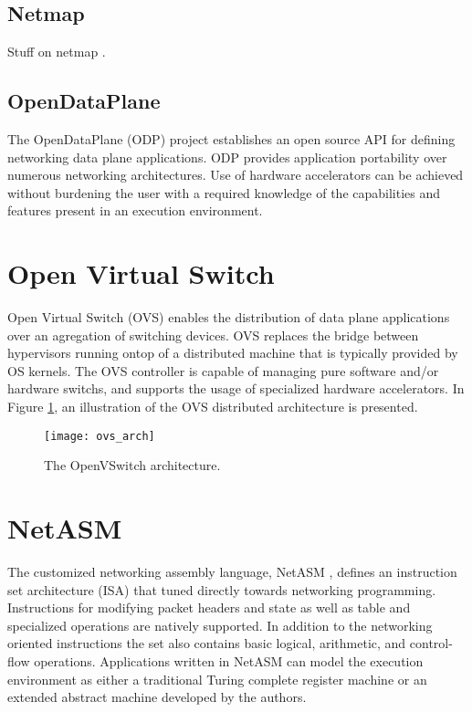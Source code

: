 \subsection{Netmap}
\label{related:netmap}
Stuff on netmap \cite{netmap}.

\subsection{OpenDataPlane}
\label{related:frameworks:odp}
The OpenDataPlane (ODP) project \cite{odp} establishes an open source API for
defining networking data plane applications. ODP provides application
portability over numerous networking architectures. Use of hardware
accelerators can be achieved without burdening the user with a required
knowledge of the capabilities and features present in an execution environment.

\section{Open Virtual Switch}
\label{related:frameworks:ovs}
Open Virtual Switch (OVS) \cite{ovs} enables the distribution of data
plane applications over an agregation of switching devices. OVS replaces
the bridge between hypervisors running ontop of a distributed machine that
is typically provided by OS kernels. The OVS controller is capable of managing
pure software and/or hardware switchs, and supports the usage of specialized
hardware accelerators. In Figure \ref{ovs_arch}, an illustration of
the OVS distributed architecture is presented.

\begin{figure}[h]
\centering
\texttt{[image: ovs\_arch]}
\caption{The OpenVSwitch architecture.}
\label{ovs_arch}
\end{figure}

\section{NetASM}
\label{related:netasm}
The customized networking assembly language, NetASM \cite{netasm}, defines an
instruction set architecture (ISA) that tuned directly towards networking
programming. Instructions for modifying packet headers and state as well
as table and specialized operations are natively supported. In addition to the
networking oriented instructions the set also contains basic logical,
arithmetic, and control-flow operations. Applications written in NetASM can
model the execution environment as either a traditional Turing complete
register machine or an extended abstract machine developed by the authors.

